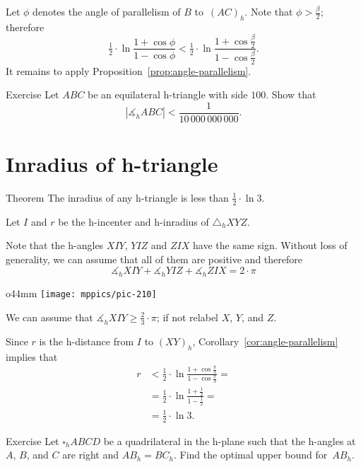 Let $\phi$ denotes the angle of parallelism of $B$ to~$(AC)_h$.
Note that $\phi>\tfrac\beta2$; therefore 
\[
\tfrac12\cdot\ln \frac{1+\cos\phi}{1-\cos\phi}
<
\tfrac12\cdot\ln \frac{1+\cos\frac\beta2}{1-\cos\frac\beta2}.\]
It remains to apply Proposition~\ref{prop:angle-parallelism}.
\qeds


\begin{thm}{Exercise}\label{ex:small-angle}
Let $ABC$ be an equilateral h-triangle with side $100$.
Show that 
\[|\measuredangle_h ABC|<\frac1{10\,000\,000\,000}.\]
\end{thm}

\section*{Inradius of h-triangle}

\begin{thm}{Theorem}\label{thm:h-inradius}
The inradius of any h-triangle 
is less than $\tfrac12\cdot\ln3$.
\end{thm}

Let $I$ and $r$ be the h-incenter and h-inradius of $\triangle_hXYZ$.

Note that the h-angles 
$XIY$, 
$YIZ$ and 
$ZIX$
have the same sign.
Without loss of generality, we can assume that all of them are positive
and therefore
\[\measuredangle_hXIY+ 
\measuredangle_hYIZ+ 
\measuredangle_hZIX=2\cdot\pi
\]

{

\begin{wrapfigure}{o}{44mm}
\centering
\texttt{[image: mppics/pic-210]}
\end{wrapfigure}

We can assume that
$\measuredangle_hXIY\ge\tfrac23\cdot\pi$;
if not relabel $X$, $Y$, and $Z$. 

Since $r$ is the h-distance from $I$ to $(XY)_h$,
Corollary~\ref{cor:angle-parallelism} implies that
\begin{align*}r&<\tfrac12\cdot\ln \tfrac{1+\cos\frac\pi3}{1-\cos\frac\pi3}=
\\
&=\tfrac12\cdot\ln\frac{1+\tfrac12}{1-\tfrac12}=
\\
&=\tfrac12\cdot\ln 3.
\end{align*}
\qedsf

}

\begin{thm}{Exercise}\label{ex:side-sup}
Let $\square_h ABCD$ be a quadrilateral in the h-plane 
such that the h-angles at $A$, $B$, and $C$ are right and $AB_h=BC_h$.
Find the optimal upper bound for~$AB_h$.
\end{thm}


